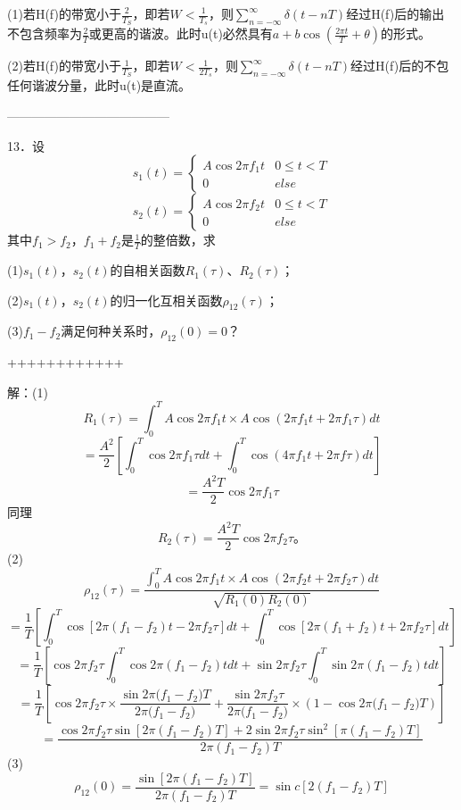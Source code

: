 \documentclass[utf8]{article}
\begin{document}
(1)若H(f)的带宽小于$\frac{2}{T_{S}}$，即若$W< \frac{1}{T_{s}}$，则$\sum_{n=- \infty}^{ \infty} \delta \left( t-nT \right)$经过H(f)后的输出不包含频率为$\frac{2}{T}$或更高的谐波。此时u(t)必然具有$a+b \cos \left( \frac{2 \pi t}{T}+ \theta \right)$的形式。

(2)若H(f)的带宽小于$\frac{1}{T_{S}}$，即若$W< \frac{1}{2T_{s}}$，则$\sum_{n=- \infty}^{ \infty} \delta \left( t-nT \right)$经过H(f)后的不包任何谐波分量，此时u(t)是直流。

---------------------------------------

13．设
$$s_{1} \left( t \right)= \left \{ \begin{matrix} A \cos 2 \pi f_{1}t&0 \leq t<T \\ 0&else \end{matrix} \right.$$
$$s_{2} \left( t \right)= \left \{ \begin{matrix} A \cos 2 \pi f_{2}t&0 \leq t<T \\ 0&else \end{matrix} \right.$$
其中$f_{1} > f_{2}$，$f_{1} + f_{2}$是$\frac{1}{T}$的整倍数，求

(1)$s_{1}\left( t \right)$，$s_{2}\left( t \right)$的自相关函数$R_{1} \left( \tau \right)$、$R_{2} \left( \tau \right)$；

(2)$s_{1}\left( t \right)$，$s_{2}\left( t \right)$的归一化互相关函数$\rho_{12} \left( \tau \right)$；

(3)$f_{1} - f_{2}$满足何种关系时，$\rho_{12} \left( 0 \right)= 0$？

++++++++++++

解：(1)
$$R_{1} \left( \tau \right)= \int_{0}^{T}A \cos 2 \pi f_{1}t \times A \cos \left( 2 \pi f_{1}t+2 \pi f_{1} \tau \right) dt$$
$$= \frac{A^{2}}{2} \left[ \int_{0}^{T} \cos 2 \pi f_{1} \tau dt+ \int_{0}^{T} \cos \left( 4 \pi f_{1}t+2 \pi f \tau \right) dt \right]$$
$$= \frac{A^{2}T}{2} \cos 2 \pi f_{1} \tau$$
同理
$$R_{2} \left( \tau \right)= \frac{A^{2}T}{2} \cos 2 \pi f_{2} \tau 。$$
(2)
$$\rho_{12} \left( \tau \right)= \frac{ \int_{0}^{T}A \cos 2 \pi f_{1}t \times A \cos \left( 2 \pi f_{2}t+2 \pi f_{2} \tau \right) dt}{ \sqrt{R_{1} \left( 0 \right) R_{2} \left( 0 \right)}}$$
$$= \frac{1}{T} \left[ \int_{0}^{T} \cos \left[ 2 \pi \left( f_{1}-f_{2} \right) t-2 \pi f_{2} \tau \right] dt+ \int_{0}^{T} \cos \left[ 2 \pi \left( f_{1}+f_{2} \right) t+2 \pi f_{2} \tau \right] dt \right]$$
$$= \frac{1}{T} \left[ \cos 2 \pi f_{2} \tau \int_{0}^{T} \cos 2 \pi \left( f_{1}-f_{2} \right) tdt+ \sin 2 \pi f_{2} \tau \int_{0}^{T} \sin 2 \pi \left( f_{1}-f_{2} \right) tdt \right]$$
$$= \frac{1}{T} \left[\cos 2\pi f_{2} \tau \times \frac{ \sin 2\pi \big( f_{1} - f_{2} \big)T}{2\pi \big( f_{1} - f_{2} \big)} + \frac{\sin 2\pi f_{2} \tau}{2\pi \big( f_{1} - f_{2} \big)} \times \left( 1 - \cos 2\pi \big( f_{1} - f_{2} \big)T\right)\right]$$
$$= \frac{ \cos 2 \pi f_{2} \tau \sin \left[ 2 \pi \left( f_{1}-f_{2} \right) T \right]+2 \sin 2 \pi f_{2} \tau \sin^2 \left[ \pi \left( f_{1}-f_{2} \right) T \right]}{2 \pi \left( f_{1}-f_{2} \right) T}$$
(3)
$$\rho_{12} \left( 0 \right)= \frac{ \sin \left[ 2 \pi \left( f_{1}-f_{2} \right) T \right]}{2 \pi \left( f_{1}-f_{2} \right) T}= \sin c \left[ 2 \left( f_{1}-f_{2} \right) T \right]$$
\end{document}
